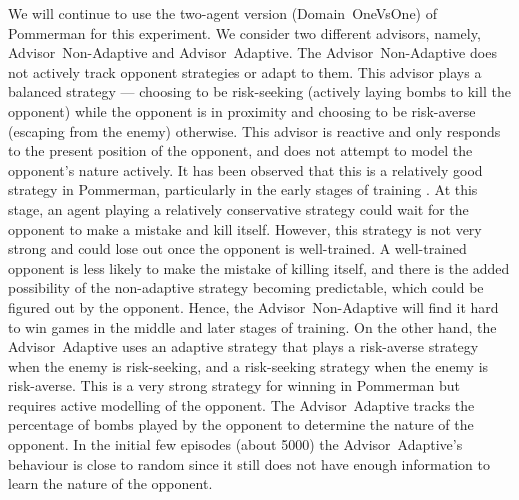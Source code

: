 \documentclass[jair, twoside,11pt,theapa]{article}
\begin{document}
We will continue to use the two-agent version (Domain~OneVsOne) of Pommerman for this experiment. We consider two different advisors, namely, Advisor~Non-Adaptive and Advisor~Adaptive. The Advisor~Non-Adaptive does not actively track opponent strategies or adapt to them. This advisor plays a balanced strategy --- choosing to be risk-seeking (actively laying bombs to kill the opponent) while the opponent is in proximity and choosing to be risk-averse (escaping from the enemy) otherwise. This advisor is reactive and only responds to the present position of the opponent, and does not attempt to model the opponent's nature actively. It has been observed that this is a relatively good strategy in Pommerman, particularly in the early stages of training \citep{meisheri2019accelerating}.  At this stage, an agent playing a relatively conservative strategy could wait for the opponent to make a mistake and kill itself. However, this strategy is not very strong and could lose out once the opponent is well-trained. A well-trained opponent is less likely to make the mistake of killing itself, and there is the added possibility of the non-adaptive strategy becoming predictable, which could be figured out by the opponent. Hence, the Advisor~Non-Adaptive will find it hard to win games in the middle and later stages of training.  On the other hand, the Advisor~Adaptive uses an adaptive strategy that plays a risk-averse strategy when the enemy is risk-seeking, and a risk-seeking strategy  when the enemy is risk-averse. This is a very strong strategy for winning in Pommerman \citep{zhou2018hybrid} but requires active modelling of the opponent. The Advisor~Adaptive tracks the percentage of bombs played by the opponent to determine the nature of the opponent. In the initial few episodes (about 5000) the Advisor~Adaptive's behaviour is close to random since it still does not have enough information to learn the nature of the opponent. 
\end{document}
